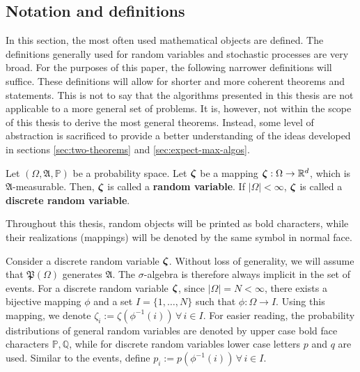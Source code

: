 \subsection{Notation and definitions}
In this section, the most often used mathematical objects are defined.
The definitions generally used for random variables and stochastic processes are very broad.
For the purposes of this paper, the following narrower definitions will suffice.
These definitions will allow for shorter and more coherent theorems and statements.
This is not to say that the algorithms presented in this thesis are not applicable to a more general set of problems.
It is, however, not within the scope of this thesis to derive the most general theorems. Instead, some level of abstraction is sacrificed to provide a better understanding of the ideas developed in sections \ref{sec:two-theorems} and \ref{sec:expect-max-algos}.
\begin{definition}
  \label{def:random_variable}
  Let $(\Omega, \mathfrak{A}, \mathbb{P})$ be a probability space.
  Let $\boldsymbol\zeta$ be a mapping $\boldsymbol\zeta:\Omega\rightarrow\mathbb{R}^d$, which is $\mathfrak{A}$-measurable.
  Then, $\boldsymbol\zeta$ is called a \textbf{random variable}.
  If $|\Omega|<\infty$, $\boldsymbol\zeta$ is called a \textbf{discrete random variable}.
  \end{definition}
\begin{remark}
  Throughout this thesis, random objects will be printed as bold characters, while their realizations (mappings) will be denoted by the same symbol in normal face.
\end{remark}
\begin{remark}
  \label{remark:discrete-randvar-indexsets}
  Consider a discrete random variable $\boldsymbol\zeta$.
  Without loss of generality, we will assume that $\mathfrak{P}(\Omega)$ generates $\mathfrak{A}$.
  The $\sigma$-algebra is therefore always implicit in the set of events.
  For a discrete random variable $\boldsymbol\zeta$, since $|\Omega|=N<\infty$, there exists a bijective mapping $\phi$ and a set $I=\{1,\ldots, N\}$ such that $\phi:\Omega \rightarrow I$.
  Using this mapping, we denote $\zeta_i := \zeta(\phi^{-1}(i))\,\forall\,i\in I$.
  For easier reading, the probability distributions of general random variables are denoted by upper case bold face characters $\mathbb{P,Q}$, while for discrete random variables lower case letters $p$ and $q$ are used.
  Similar to the events, define $p_i := p(\phi^{-1}(i))\,\forall\,i\in I$.
\end{remark}
